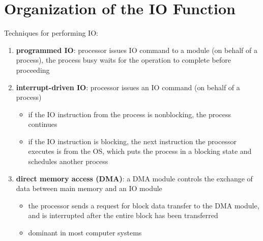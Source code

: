 \documentclass[11pt]{article}
\begin{document}
\section{Organization of the IO Function}
\label{sec:org3a5fe0c}
Techniques for performing IO:
\begin{enumerate}
\item \textbf{programmed IO}: processor issues IO command to a module (on behalf of a process), the process
busy waits for the operation to complete before proceeding
\item \textbf{interrupt-driven IO}: processor issues an IO command (on behalf of a process)
\begin{itemize}
\item if the IO instruction from the process is nonblocking, the process continues
\item if the IO instruction is blocking, the next instruction the processor executes is from the
OS, which puts the process in a blocking state and schedules another process
\end{itemize}
\item \textbf{direct memory access (DMA)}: a DMA module controls the exchange of data between main memory
and an IO module
\begin{itemize}
\item the processor sends a request for block data transfer to the DMA module, and is interrupted
after the entire block has been transferred
\item dominant in most computer systems
\end{itemize}
\end{enumerate}
\end{document}
